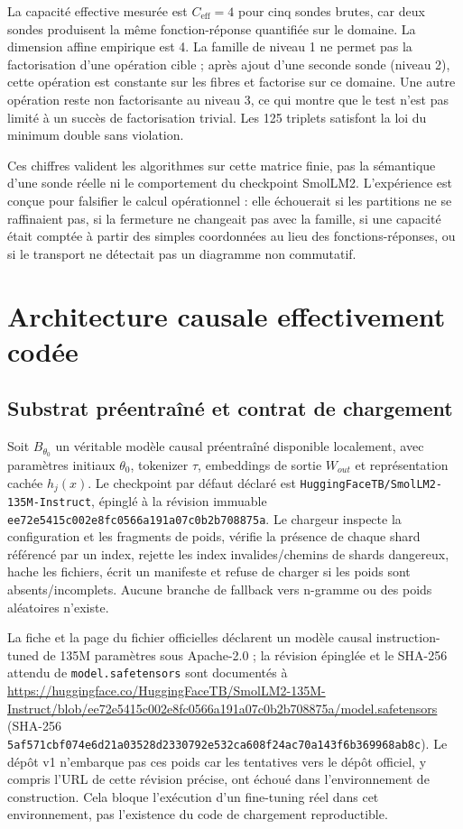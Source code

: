 \documentclass[11pt,a4paper]{article}
\begin{document}
La capacité effective mesurée est \(C_{\mathrm{eff}}=4\) pour cinq sondes brutes, car deux sondes produisent la même fonction-réponse quantifiée sur le domaine. La dimension affine empirique est 4. La famille de niveau 1 ne permet pas la factorisation d'une opération cible ; après ajout d'une seconde sonde (niveau 2), cette opération est constante sur les fibres et factorise sur ce domaine. Une autre opération reste non factorisante au niveau 3, ce qui montre que le test n'est pas limité à un succès de factorisation trivial. Les 125 triplets satisfont la loi du minimum double sans violation.

Ces chiffres valident les algorithmes sur cette matrice finie, pas la sémantique d'une sonde réelle ni le comportement du checkpoint SmolLM2. L'expérience est conçue pour falsifier le calcul opérationnel : elle échouerait si les partitions ne se raffinaient pas, si la fermeture ne changeait pas avec la famille, si une capacité était comptée à partir des simples coordonnées au lieu des fonctions-réponses, ou si le transport ne détectait pas un diagramme non commutatif.

\section{Architecture causale effectivement codée}
\subsection{Substrat préentraîné et contrat de chargement}
Soit \(B_{\theta_0}\) un véritable modèle causal préentraîné disponible localement, avec paramètres initiaux \(\theta_0\), tokenizer \(\tau\), embeddings de sortie \(W_{out}\) et représentation cachée \(h_j(x)\). Le checkpoint par défaut déclaré est \texttt{HuggingFaceTB/SmolLM2-135M-Instruct}, épinglé à la révision immuable \texttt{ee72e5415c002e8fc0566a191a07c0b2b708875a}. Le chargeur inspecte la configuration et les fragments de poids, vérifie la présence de chaque shard référencé par un index, rejette les index invalides/chemins de shards dangereux, hache les fichiers, écrit un manifeste et refuse de charger si les poids sont absents/incomplets. Aucune branche de fallback vers n-gramme ou des poids aléatoires n'existe.

La fiche et la page du fichier officielles déclarent un modèle causal instruction-tuned de 135M paramètres sous Apache-2.0 ; la révision épinglée et le SHA-256 attendu de \texttt{model.safetensors} sont documentés à \url{https://huggingface.co/HuggingFaceTB/SmolLM2-135M-Instruct/blob/ee72e5415c002e8fc0566a191a07c0b2b708875a/model.safetensors} (SHA-256 \texttt{5af571cbf074e6d21a03528d2330792e532ca608f24ac70a143f6b369968ab8c}). Le dépôt v1 n'embarque pas ces poids car les tentatives vers le dépôt officiel, y compris l'URL de cette révision précise, ont échoué dans l'environnement de construction. Cela bloque l'exécution d'un fine-tuning réel dans cet environnement, pas l'existence du code de chargement reproductible.
\end{document}
